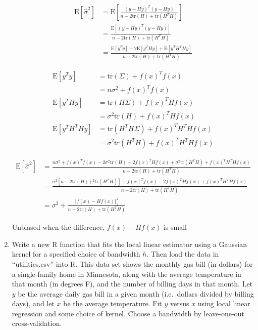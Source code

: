 \documentclass[10pt]{article}
\begin{document}
\begin{enumerate}[label=(\Alph*)]
        \begin{align*}
            \text{E} \left[ \hat{\sigma}^2\right] &= \text{E} \left[ \frac{(y - Hy)^T (y - Hy)}{n - 2\mbox{tr}(H) + \mbox{tr}(H^T H)} \right] \\
            &= \frac{\text{E}[(y - Hy)^T (y - Hy)]}{n - 2\mbox{tr}(H) + \mbox{tr}(H^T H)} \\
            &= \frac{\text{E}[y^Ty] - 2 \text{E}[y^T H y] + \text{E}[y^T H^T H y]}{n - 2\mbox{tr}(H) + \mbox{tr}(H^T H)}
        \end{align*}

        \begin{align*}
            \text{E}[y^Ty] &= \mbox{tr}( \Sigma) + f(x)^T f(x) \\
            &= n \sigma^2 + f(x)^T f(x) \\
            \text{E}[y^T H y] &= \mbox{tr}(H \Sigma) + f(x)^T H f(x) \\
            &= \sigma^2 \mbox{tr}(H) + f(x)^T H f(x) \\
            \text{E}[y^T H^T H y] &= \mbox{tr}(H^T H \Sigma) + f(x)^T H^T H f(x) \\
            &= \sigma^2 \mbox{tr}(H^T H) + f(x)^T H^T H f(x)
        \end{align*}

        \begin{align*}
            \text{E} \left[ \hat{\sigma}^2\right] &= \frac{n \sigma^2 + f(x)^T f(x) - 2\sigma^2 \mbox{tr}(H) - 2 f(x)^T H f(x) + \sigma^2 \mbox{tr}(H^T H) + f(x)^T H^T H f(x)}{n - 2\mbox{tr}(H) + \mbox{tr}(H^T H)}\\
            &= \frac{\sigma^2 [n - 2 \mbox{tr}(H)+ ^2 \mbox{tr}(H^T H)] + f(x)^T f(x)  - 2 f(x)^T H f(x)  + f(x)^T H^T H f(x)}{n - 2\mbox{tr}(H) + \mbox{tr}(H^T H)}\\
            &= \sigma^2 + \frac{\Vert f(x) - H f(x)\Vert_2^2}{n - 2\mbox{tr}(H) + \mbox{tr}(H^T H)}
        \end{align*}

        Unbiased when the difference, $f(x) - H f(x)$ is small

        \item Write a new R function that fits the local linear estimator using a Gaussian kernel for a specified choice of bandwidth $h$. Then load the data in ``utilities.csv'' into R. This data set shows the monthly gas bill (in dollars) for a single-family home in Minnesota, along with the average temperature in that month (in degrees F), and the number of billing days in that month.  Let $y$ be the average daily gas bill in a given month (i.e.~dollars divided by billing days), and let $x$ be the average temperature.  Fit $y$ versus $x$ using local linear regression and some choice of kernel.  Choose a bandwidth by leave-one-out cross-validation.


\end{enumerate}
\end{document}
